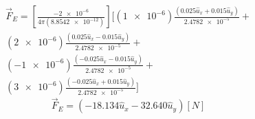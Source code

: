 \documentclass[letter,11pt]{article}
\begin{document}
\begin{equation*}
\begin{split}
    \vec{F}_E =
        \left[ \frac{\num{-2e-6}}{4\pi(\num{8.8542e-12})} \right]
        \Biggl[ (\num{1e-6})\frac{(0.025 \hat{u}_x + 0.015 \hat{u}_y)}{\num{2.4782e-5}}+
    \\
        (\num{2e-6})\frac{(0.025 \hat{u}_x - 0.015 \hat{u}_y)}{\num{2.4782e-5}}+
    \\
        (\num{-1e-6})\frac{(-0.025 \hat{u}_x - 0.015 \hat{u}_y)}{\num{2.4782e-5}}+
    \\
        (\num{3e-6})\frac{(-0.025 \hat{u}_x + 0.015 \hat{u}_y)}{\num{2.4782e-5}} \Biggr]
\end{split}
\end{equation*}
\begin{equation*}
    \vec{F}_E = (-18.134 \hat{u}_x -32.640 \hat{u}_y) [N]
\end{equation*}
\end{document}
